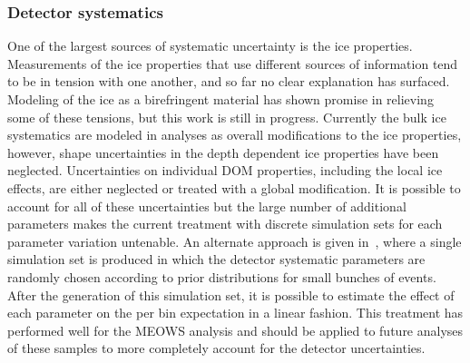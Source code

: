 \subsubsection{Detector systematics}
One of the largest sources of systematic uncertainty is the ice properties.
Measurements of the ice properties that use different sources of information tend to be in tension with one another, and so far no clear explanation has surfaced.
Modeling of the ice as a birefringent material has shown promise in relieving some of these tensions, but this work is still in progress.
Currently the bulk ice systematics are modeled in analyses as overall modifications to the ice properties, however, shape uncertainties in the depth dependent ice properties have been neglected.
Uncertainties on individual DOM properties, including the local ice effects, are either neglected or treated with a global modification.
It is possible to account for all of these uncertainties but the large number of additional parameters makes the current treatment with discrete simulation sets for each parameter variation untenable.
An alternate approach is given in~\cite{Aartsen:2019jcj}, where a single simulation set is produced in which the detector systematic parameters are randomly chosen according to prior distributions for small bunches of events.
After the generation of this simulation set, it is possible to estimate the effect of each parameter on the per bin expectation in a linear fashion.
This treatment has performed well for the MEOWS analysis and should be applied to future analyses of these samples to more completely account for the detector uncertainties.